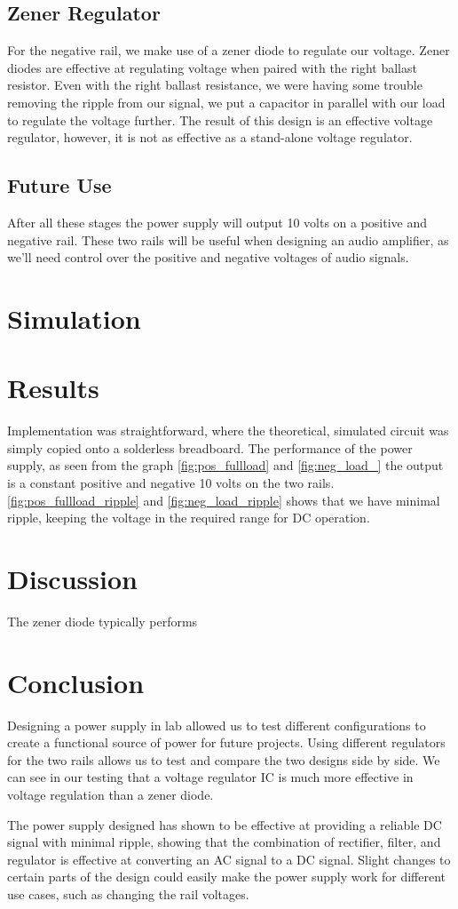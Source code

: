 \documentclass[12pt]{article}
\begin{document}
\subsection{Zener Regulator}
For the negative rail, we make use of a zener diode to regulate our voltage. Zener diodes are effective at regulating voltage when paired with the right ballast resistor. Even 
with the right ballast resistance, we were having some trouble removing the ripple from our signal, we put a capacitor in parallel with our load to regulate the voltage further. 
The result of this design is an effective voltage regulator, however, it is not as effective as a stand-alone voltage regulator.

\subsection{Future Use}
After all these stages the power supply will output 10 volts on a positive and negative rail. These two rails will be useful when designing an audio amplifier, as we'll need control over the 
positive and negative voltages of audio signals.


\section{Simulation}

\section{Results}

Implementation was straightforward, where the theoretical, simulated circuit was simply
copied onto a solderless breadboard. The performance of the power supply, as seen from the graph \ref{fig:pos_fullload} and \ref{fig:neg_load_} 
the output is a constant positive and negative 10 volts on the two rails. \ref{fig:pos_fullload_ripple} and \ref{fig:neg_load_ripple} shows that we have minimal ripple, keeping the voltage in the required range 
for DC operation.

\section{Discussion}

The zener diode typically performs

\section{Conclusion}
Designing a power supply in lab allowed us to test different configurations to create a functional source of power for future projects. 
Using different regulators for the two rails allows us to test and compare the two designs side by side. We can see in our testing that a voltage regulator IC is much more effective 
in voltage regulation than a zener diode.

The power supply designed has shown to be effective at providing a reliable DC signal with minimal ripple, showing that the combination of rectifier, filter, and regulator is effective 
at converting an AC signal to a DC signal. Slight changes to certain parts of the design could easily make the power supply work for different use cases, such as changing the rail voltages.
\end{document}
